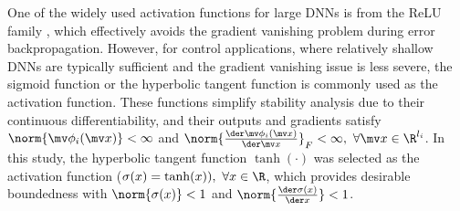 \documentclass[lettersize,journal]{IEEEtran}
\newcommand*{\dtfrac}[2]{\tfrac{\der #1}{\der #2}}
\newcommand*{\act}{\mv\phi}
\begin{document}
One of the widely used activation functions for large DNNs is from the ReLU family \cite{RN27}, which effectively avoids the gradient vanishing problem during error backpropagation. 
However, for control applications, where relatively shallow DNNs are typically sufficient and the gradient vanishing issue is less severe, the sigmoid function or the hyperbolic tangent function is commonly used as the activation function. 
These functions simplify stability analysis due to their continuous differentiability, and their outputs and gradients satisfy $\norm{\act_i(\mv x)} < \infty$ and  $\norm{\dtfrac{\act_i(\mv x)}{\mv x}}_F < \infty,\ \forall\mv x\in\R^{l_i}$. 
In this study, the hyperbolic tangent function $\tanh(\cdot)$ was selected as the activation function (\ie $\sigma(x) = \tanh(x)),\ \forall x\in\R$, which provides desirable boundedness with $\norm{\sigma(x)}<1$ and $\norm{\dtfrac{\sigma(x)}{x}}< 1$.
\end{document}
